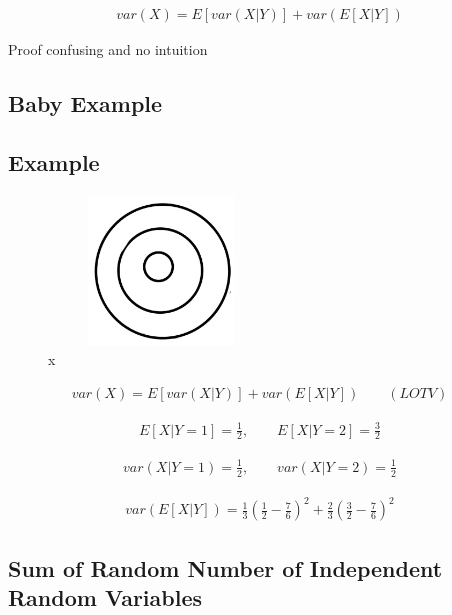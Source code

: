 \begin{align}
var(X) = E[var(X|Y)] + var(E[X|Y])
\label{eq_law_tot_var}
\end{align}

Proof confusing and no intuition

\subsection{Baby Example}


\subsection{Example}

\begin{figure}[ht]
\centering
\includegraphics[width=6cm, height=4cm]{images/L11/percent_circle.jpeg}
\caption{x}
\end{figure}

\begin{align*}
var(X) = E[var(X|Y)] + var(E[X|Y]) \qquad (LOTV)
\end{align*}

\begin{align*}
E[X|Y=1] = \frac{1}{2}, \qquad E[X|Y=2] = \frac{3}{2}
\end{align*}

\begin{align*}
var(X|Y=1) = \frac{1}{2}, \qquad var(X|Y=2) = \frac{1}{2}
\end{align*}

\begin{align*}
var(E[X|Y]) = \frac{1}{3} \left(\frac{1}{2} - \frac{7}{6} \right)^2 + \frac{2}{3} \left( \frac{3}{2} - \frac{7}{6} \right)^2
\end{align*}

\subsection{Sum of Random Number of Independent Random Variables}

